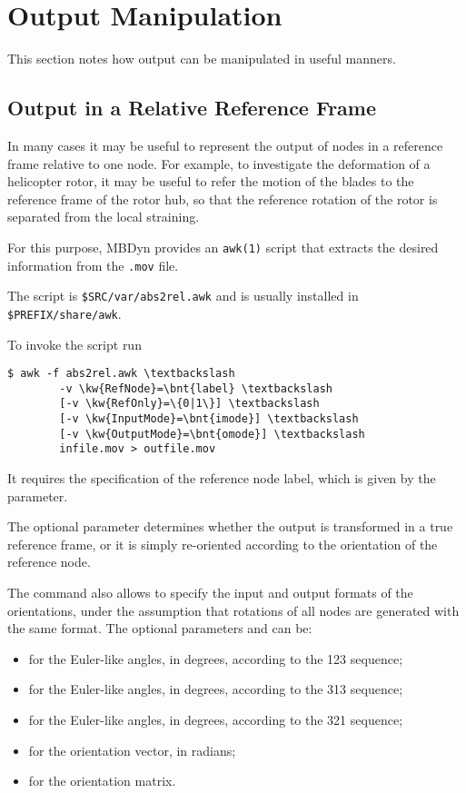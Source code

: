 \section{Output Manipulation}
This section notes how output can be manipulated in useful manners.

\subsection{Output in a Relative Reference Frame}
In many cases it may be useful to represent the output 
of  nodes in a reference frame relative to one node.
For example, to investigate the deformation of a helicopter rotor,
it may be useful to refer the motion of the blades
to the reference frame of the rotor hub, so that the reference 
rotation of the rotor is separated from the local straining.

For this purpose, MBDyn provides an \texttt{awk(1)} script that
extracts the desired information from the \texttt{.mov} file.

The script is \texttt{\$SRC/var/abs2rel.awk}
and is usually installed in \texttt{\$PREFIX/share/awk}.

To invoke the script run
\begin{Verbatim}[commandchars=\\\{\}]
    $ awk -f abs2rel.awk \textbackslash
        -v \kw{RefNode}=\bnt{label} \textbackslash
        [-v \kw{RefOnly}=\{0|1\}] \textbackslash
        [-v \kw{InputMode}=\bnt{imode}] \textbackslash
        [-v \kw{OutputMode}=\bnt{omode}] \textbackslash
        infile.mov > outfile.mov
\end{Verbatim}
It requires the specification of the reference node label,
which is given by the  parameter.

The optional parameter  determines whether the output
is transformed in a true reference frame, or it is simply re-oriented
according to the orientation of the reference node.

The command also allows to specify the input and output formats 
of the orientations, under the assumption that rotations
of all nodes are generated with the same format.
The optional parameters  and  can be:
\begin{itemize}
\item {} for the Euler-like angles, in degrees,
	according to the 123 sequence;
\item {} for the Euler-like angles, in degrees,
	according to the 313 sequence;
\item {} for the Euler-like angles, in degrees,
	according to the 321 sequence;
\item {} for the orientation vector, in radians;
\item {} for the orientation matrix.
\end{itemize}

